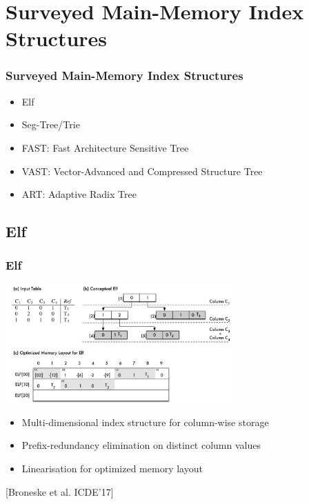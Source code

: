 \documentclass{beamer}
\begin{document}
\section{Surveyed Main-Memory Index Structures}

\begin{frame}
\frametitle{Surveyed Main-Memory Index Structures}
\begin{itemize}[label=\textbullet,leftmargin=1em]
\item Elf \begin{tiny}\end{tiny} 
\item Seg-Tree/Trie \begin{tiny} \end{tiny} 
\item FAST: Fast Architecture Sensitive Tree \begin{tiny} \end{tiny} 
\item VAST: Vector-Advanced and Compressed Structure Tree \begin{tiny}\end{tiny} 
\item ART: Adaptive Radix Tree \begin{tiny}\end{tiny} 
\end{itemize}
\end{frame}

\subsection{Elf}
\begin{frame}
\frametitle{Elf}
\begin{center}
\includegraphics[width=0.65\textwidth]{img/elf.pdf}
\end{center}
\begin{itemize}[label=\textbullet,leftmargin=1em]
\item Multi-dimensional index structure for column-wise storage
\item Prefix-redundancy elimination on distinct column values
\item Linearisation for optimized memory layout
\end{itemize}
\begin{center}
\tiny [Broneske et al. ICDE’17]
\end{center}
\end{frame}
\end{document}
